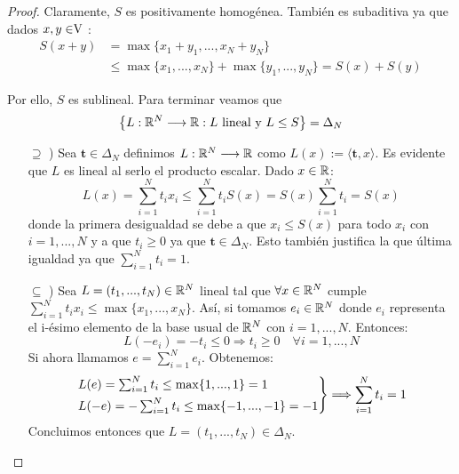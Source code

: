 	\begin{proof}
		Claramente, $ S $ es positivamente homogénea. También es subaditiva ya que dados $ x,y \in \vecSpace $ : 
		\begin{equation*}
		\begin{split}
		S(x+y) &= \max \{x_1 + y_1, ..., x_N +y_N \}\\ 
		&\leq \max\{x_1, ..., x_N\} + \max \{y_1, ...,y_N\} = S(x) + S(y)
		\end{split}
		\end{equation*}
		
		Por ello, $ S $ es sublineal. Para terminar veamos que 
		\begin{equation*}
			\left\lbrace L:\mathbb{R}^N \longrightarrow \mathbb{R} : L \text{ lineal y }L\leq S \right\rbrace = \Delta_N
		\end{equation*}
		
		\begin{itemize}
			\item[$ \supseteq $ )] Sea $ \mathbf{t} \in \Delta_N$ definimos $ L:\mathbb{R}^N \longrightarrow \mathbb{R} $ como $ L(x):= \langle \mathbf{t},x \rangle $. Es evidente que $ L $ es lineal al serlo el producto escalar. Dado $ x \in \mathbb{R} $:
			\begin{equation*}
				L(x) = \sum_{i=1}^{N}{t_i x_i} \leq \sum_{i=1}^{N}{t_i S(x)} = S(x)\sum_{i=1}^{N}{t_i} = S(x)
			\end{equation*}
			donde la primera desigualdad se debe a que $ x_i \leq S(x)$ para todo $ x_i$ con $ i=1,...,N $ y a que $ t_i \geq 0 $ ya que $ \mathbf{t} \in \Delta_N$. Esto también justifica la que última igualdad ya que $ \sum_{i=1}^{N}{t_i} = 1 $.
			
			\item[$ \subseteq $ )] Sea $ L =  (t_1,...,t_N) \in \mathbb{R}^N $ lineal tal que $ \forall x \in \mathbb{R}^N $ cumple $ \sum_{i=1}^{N}{t_i x_i} \leq \max\{x_1,...,x_N\}$. Así, si tomamos $ e_i \in \mathbb{R}^N $ donde $ e_i $ representa el i-ésimo elemento de la base usual de $ \mathbb{R}^N $ con $ i=1,...,N $. Entonces:   		
			\begin{equation*}
				L(-e_i) = -t_i \leq 0 \Longrightarrow t_i \geq 0 \quad \forall i=1,...,N
			\end{equation*}
			Si ahora llamamos $ e = \sum_{i=1}^{N}{e_i} $. Obtenemos:
			\begin{equation*}
				\begin{rcases*}
				L(e) = \sum_{i=1}^{N}{t_i} \leq \max \{1, ...,1\} = 1 \\
				L(-e) = -\sum_{i=1}^{N}{t_i} \leq \max \{-1, ...,-1\} = -1
				\end{rcases*} \Longrightarrow \sum_{i=1}^{N}{t_i} = 1
			\end{equation*}
			Concluimos entonces que $ L =  (t_1,...,t_N) \in \Delta_N $.
		\end{itemize}
		
	\end{proof}


